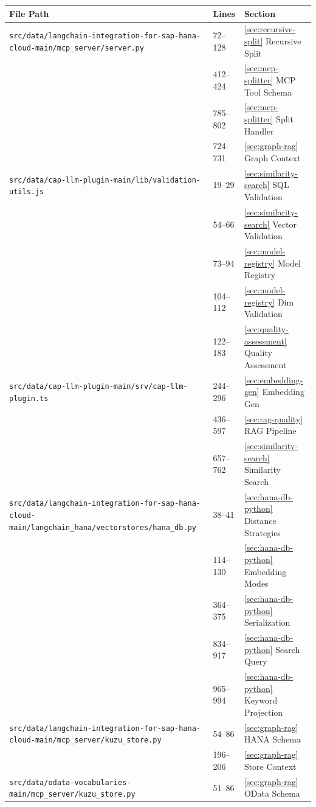 \documentclass[11pt]{article}
\begin{document}
\begin{longtable}{p{}p{}p{}}
\toprule
\textbf{File Path} & \textbf{Lines} & \textbf{Section} \\
\midrule
\endhead
\texttt{src/data/langchain-integration-for-sap-hana-cloud-main/mcp\_server/server.py}
  & 72--128 & \ref{sec:recursive-split} Recursive Split \\
  & 412--424 & \ref{sec:mcp-splitter} MCP Tool Schema \\
  & 785--802 & \ref{sec:mcp-splitter} Split Handler \\
  & 724--731 & \ref{sec:graph-rag} Graph Context \\
\midrule
\texttt{src/data/cap-llm-plugin-main/lib/validation-utils.js}
  & 19--29 & \ref{sec:similarity-search} SQL Validation \\
  & 54--66 & \ref{sec:similarity-search} Vector Validation \\
  & 73--94 & \ref{sec:model-registry} Model Registry \\
  & 104--112 & \ref{sec:model-registry} Dim Validation \\
  & 122--183 & \ref{sec:quality-assessment} Quality Assessment \\
\midrule
\texttt{src/data/cap-llm-plugin-main/srv/cap-llm-plugin.ts}
  & 244--296 & \ref{sec:embedding-gen} Embedding Gen \\
  & 436--597 & \ref{sec:rag-quality} RAG Pipeline \\
  & 657--762 & \ref{sec:similarity-search} Similarity Search \\
\midrule
\texttt{src/data/langchain-integration-for-sap-hana-cloud-main/langchain\_hana/vectorstores/hana\_db.py}
  & 38--41 & \ref{sec:hana-db-python} Distance Strategies \\
  & 114--130 & \ref{sec:hana-db-python} Embedding Modes \\
  & 364--375 & \ref{sec:hana-db-python} Serialization \\
  & 834--917 & \ref{sec:hana-db-python} Search Query \\
  & 965--994 & \ref{sec:hana-db-python} Keyword Projection \\
\midrule
\texttt{src/data/langchain-integration-for-sap-hana-cloud-main/mcp\_server/kuzu\_store.py}
  & 54--86 & \ref{sec:graph-rag} HANA Schema \\
  & 196--206 & \ref{sec:graph-rag} Store Context \\
\midrule
\texttt{src/data/odata-vocabularies-main/mcp\_server/kuzu\_store.py}
  & 51--86 & \ref{sec:graph-rag} OData Schema \\
\bottomrule
\end{longtable}
\end{document}
